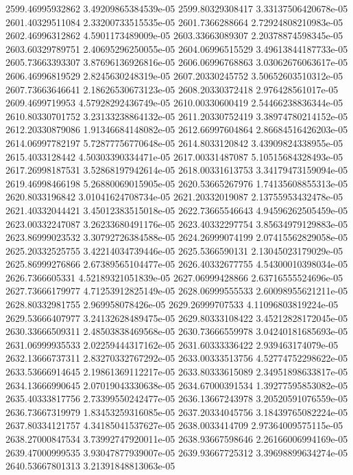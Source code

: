 {2599.46995932862 3.49209865384539e-05
2599.80329308417 3.33137506420678e-05
2601.40329511084 2.33200733515535e-05
2601.7366288664 2.72924808210983e-05
2602.46996312862 4.5901173489009e-05
2603.33663089307 2.20378874598345e-05
2603.60329789751 2.40695296250055e-05
2604.06996515529 3.49613844187733e-05
2605.73663393307 3.87696136926816e-05
2606.06996768863 3.03062676063617e-05
2606.46996819529 2.8245630248319e-05
2607.20330245752 3.50652603510312e-05
2607.73663646641 2.18626530673123e-05
2608.20330372418 2.976428561017e-05
2609.4699719953 4.57928292436749e-05
2610.00330600419 2.54466238836344e-05
2610.80330701752 3.23133238864132e-05
2611.20330752419 3.38974780214152e-05
2612.20330879086 1.91346684148082e-05
2612.66997604864 2.86684516426203e-05
2614.06997782197 5.72877756770648e-05
2614.8033120842 3.43909824338955e-05
2615.4033128442 4.50303390334471e-05
2617.00331487087 5.10515684328493e-05
2617.26998187531 3.52868197942614e-05
2618.00331613753 3.34179473159094e-05
2619.46998466198 5.26880069015905e-05
2620.53665267976 1.74135608855313e-05
2620.8033196842 3.01041624708734e-05
2621.20332019087 2.13755953432478e-05
2621.40332044421 3.45012383515018e-05
2622.73665546643 4.94596262505459e-05
2623.00332247087 3.26233680491176e-05
2623.40332297754 3.85634979129883e-05
2623.86999023532 3.30792726384588e-05
2624.26999074199 2.07415562829058e-05
2625.20332525755 3.42214034739446e-05
2625.5366590131 2.13045023179029e-05
2625.86999276866 2.67389565104477e-05
2626.40332677755 4.54300010398034e-05
2626.7366605331 4.52189321051839e-05
2627.06999428866 2.63716555524696e-05
2627.73666179977 4.71253912825149e-05
2628.06999555533 2.60098955621211e-05
2628.80332981755 2.969958078426e-05
2629.26999707533 4.11096803819224e-05
2629.53666407977 3.24132628489475e-05
2629.80333108422 3.45212828172045e-05
2630.33666509311 2.48503838469568e-05
2630.73666559978 3.04240181685693e-05
2631.06999935533 2.02259444317162e-05
2631.60333336422 2.939463174079e-05
2632.13666737311 2.83270332767292e-05
2633.00333513756 4.52774752298622e-05
2633.53666914645 2.19861369112217e-05
2633.80333615089 2.34951898633817e-05
2634.13666990645 2.07019043330638e-05
2634.67000391534 1.39277595853082e-05
2635.40333817756 2.73399550242477e-05
2636.13667243978 3.20520591076559e-05
2636.73667319979 1.83453259316085e-05
2637.20334045756 3.18439765082224e-05
2637.80334121757 4.34185041537627e-05
2638.0033414709 2.97364009575115e-05
2638.27000847534 3.73992747920011e-05
2638.93667598646 2.26166006994169e-05
2639.47000999535 3.93047877939007e-05
2639.93667725312 3.39698899634274e-05
2640.53667801313 3.21391848813063e-05
}
